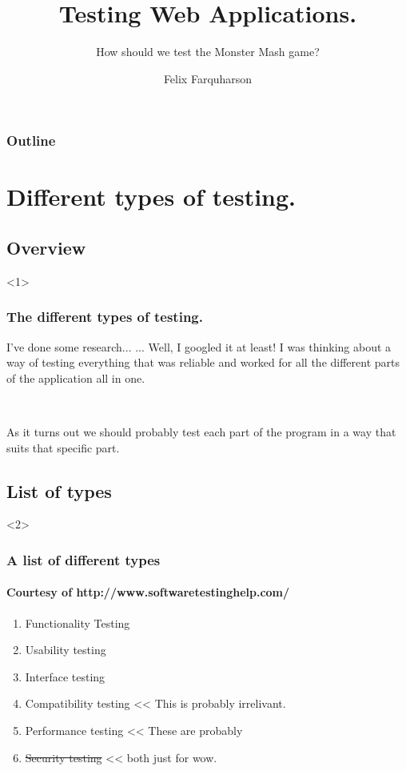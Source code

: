 \documentclass{beamer}
\title{Testing Web Applications.}
\subtitle{How should we test the Monster Mash game?}
\author{Felix Farquharson}
\institute{Group Project\\ CS2SOMETHING}
\begin{document}
\begin{frame}
  \titlepage
\end{frame}

\begin{frame}
  \frametitle{Outline}
  \tableofcontents
\end{frame}

\section{Different types of testing.}
\subsection{Overview}

\begin{frame}<1>
  \frametitle{The different types of testing.}

  \begin{block}{I've done some research...}
    ... Well, I googled it at least! I was thinking about a 
	way of testing everything that was reliable and 
	worked for all the different parts of the application
	all in one.
  \end{block}

\

As it turns out we should probably test each part of the program
in a way that suits that specific part.

\end{frame}

\subsection{List of types}

\begin{frame}<2>
  \frametitle{A list of different types}
  \framesubtitle{Courtesy of http://www.softwaretestinghelp.com/}

  \begin{enumerate}
	\item Functionality Testing
	\item Usability testing
	\item Interface testing         
	\item Compatibility testing     << This is probably irrelivant.
	\item Performance testing	<< These are probably
	\item \sout{Security testing} 	<< both just for wow.
  \end{enumerate}
\end{frame}
\end{document}
